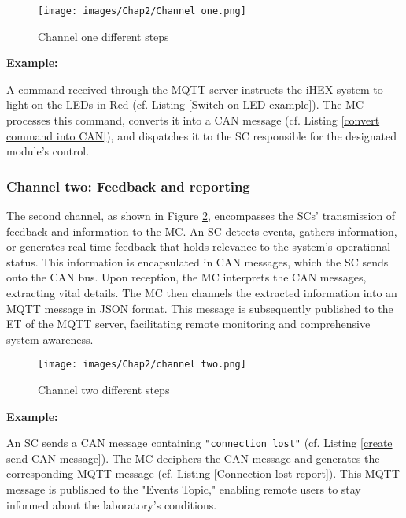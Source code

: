 \begin{figure}[H]
\begin{center}
\texttt{[image: images/Chap2/Channel one.png]}\\
\caption{Channel one different steps}
\label{Channel one}
\end{center}
\end{figure}

\textbf{Example:}

A command received through the MQTT server instructs the iHEX system to light on the LEDs in Red (cf. Listing \ref{Switch on LED example}). The MC processes this command, converts it into a CAN message (cf. Listing \ref{convert command into CAN}), and dispatches it to the SC responsible for the designated module's control.

\subsubsection{Channel two: Feedback and reporting}

The second channel, as shown in Figure \ref{Channel two}, encompasses the SCs' transmission of feedback and information to the MC. An SC detects events, gathers information, or generates real-time feedback that holds relevance to the system's operational status. This information is encapsulated in CAN messages, which the SC sends onto the CAN bus. Upon reception, the MC interprets the CAN messages, extracting vital details. The MC then channels the extracted information into an MQTT message in JSON format. This message is subsequently published to the ET of the MQTT server, facilitating remote monitoring and comprehensive system awareness.

\begin{figure}[H]
\begin{center}
\texttt{[image: images/Chap2/channel two.png]}\\
\caption{Channel two different steps}
\label{Channel two}
\end{center}
\end{figure}

\textbf{Example:}

An SC sends a CAN message containing \texttt{"connection lost"} (cf. Listing \ref{create send CAN message}). The MC deciphers the CAN message and generates the corresponding MQTT message (cf. Listing \ref{Connection lost report}). This MQTT message is published to the "Events Topic," enabling remote users to stay informed about the laboratory's conditions.

